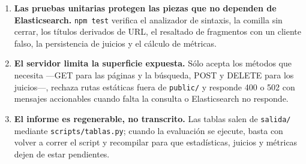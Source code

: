 \documentclass[11pt,spanish]{article}
\begin{document}
\begin{enumerate}[label=\textbf{C\arabic*}.]
  \item \textbf{Las pruebas unitarias protegen las piezas que no dependen de
    Elasticsearch.} \texttt{npm test} verifica el analizador de sintaxis, la
    comilla sin cerrar, los títulos derivados de URL, el resaltado de fragmentos
    con un cliente falso, la persistencia de juicios y el cálculo de
    métricas.

  \item \textbf{El servidor limita la superficie expuesta.} Sólo acepta los
    métodos que necesita ---GET para las páginas y la búsqueda, POST y DELETE
    para los juicios---, rechaza rutas estáticas fuera de \texttt{public/} y
    responde 400 o 502 con mensajes accionables cuando falta la consulta o
    Elasticsearch no responde.

  \item \textbf{El informe es regenerable, no transcrito.} Las tablas salen de
    \texttt{salida/} mediante \texttt{scripts/tablas.py}; cuando la evaluación
    se ejecute, basta con volver a correr el script y recompilar para que
    estadísticas, juicios y métricas dejen de estar pendientes.

\end{enumerate}
\end{document}
